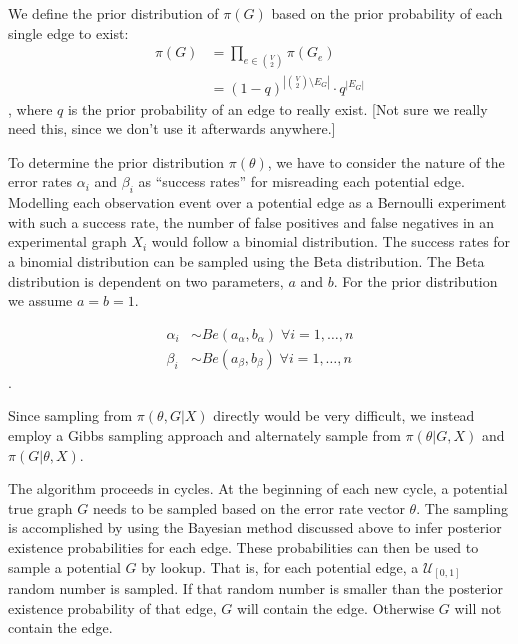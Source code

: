 \documentclass{bioinfo}
\newcommand{\note}[1]{{\color{red}[#1]}}
\begin{document}
\begin{methods}
We define the prior distribution of $\pi(G)$ based on the prior probability of each single edge to exist:
\begin{align}
  \pi(G) &= \prod_{e \in \binom{V}{2}} \pi(G_e)\\
         &= (1-q)^{\left |\binom{V}{2}\setminus E_G \right |} \cdot q^{|E_G|}
\end{align},
where $q$ is the prior probability of an edge to really exist. \note{Not sure we really need this, since we don't use it afterwards anywhere.}

To determine the prior distribution $\pi(\theta)$, we have to consider the nature of the error rates $\alpha_i$ and $\beta_i$ as ``success rates'' for misreading each potential edge. Modelling each observation event over a potential edge as a Bernoulli experiment with such a success rate, the number of false positives and false negatives in an experimental graph $X_i$ would follow a binomial distribution. The success rates for a binomial distribution can be sampled using the Beta distribution. The Beta distribution is dependent on two parameters, $a$ and $b$. For the prior distribution we assume $a = b = 1$.


\begin{align}
  \alpha_i &\sim Be(a_\alpha, b_\alpha) \; \forall i=1,\ldots,n\\
  \beta_i &\sim Be(a_\beta, b_\beta) \; \forall i=1,\ldots,n
\end{align}.


Since sampling from $\pi(\theta,G|X)$ directly would be very difficult, we instead employ a Gibbs sampling approach \citep{gelfand_sampling-based_1990} and alternately sample from $\pi(\theta|G,X)$ and $\pi(G|\theta,X)$.

The algorithm proceeds in cycles. At the beginning of each new cycle, a potential true graph $G$ needs to be sampled based on the error rate vector $\theta$. The sampling is accomplished by using the Bayesian method discussed above to infer posterior existence probabilities for each edge. These probabilities can then be used to sample a potential $G$ by lookup. That is, for each potential edge, a $\mathcal{U}_{[0,1]}$ random number is sampled. If that random number is smaller than the posterior existence probability of that edge, $G$ will contain the edge. Otherwise $G$ will not contain the edge.


\end{methods}
\end{document}

